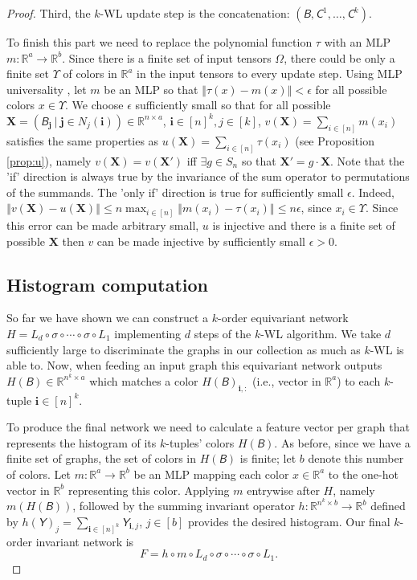 \documentclass{article}
\newcommand{\norm}[1]{\left\Vert#1\right\Vert}
\newcommand{\parr}[1]{\left (#1\right )}
\newcommand{\Real}{\mathbb R}
\newcommand{\too}{\rightarrow}
\newcommand{\ie}{{i.e.}}
\def\vi{{\bm{i}}}
\def\vj{{\bm{j}}}
\def\mX{{\bm{X}}}
\newcommand{\tens}[1]{\bm{\mathsfit{#1}}}
\def\tB{{\tens{B}}}
\def\tC{{\tens{C}}}
\def\tY{{\tens{Y}}}
\begin{document}
\begin{proof}
Third, the $k$-WL update step is the concatenation: $(\tB,\tC^1,\ldots,\tC^k)$. 


To finish this part we need to replace the polynomial function $\tau$ with an MLP $m:\Real^a\too\Real^b$. Since there is a finite set of input tensors $\Omega$, there could be only a finite set $\Upsilon$ of colors in $\Real^{a}$ in the input tensors to every update step. Using MLP universality \citep{cybenko1989approximation,hornik1991approximation} , let $m$ be an MLP so that $\norm{\tau(x)-m(x)}<\epsilon$ for all possible colors $x\in\Upsilon$.  We choose $\epsilon$ sufficiently small so that for all possible $\mX = \parr{\tB_{\vj} \ \vert \ \vj\in N_j(\vi)}\in\Real^{n\times a} $, $\vi\in[n]^k,j\in [k]$, $v(\mX)=\sum_{i\in [n]}m(x_i)$ satisfies the same properties as $u(\mX)=\sum_{i\in[n]}\tau(x_i)$ (see Proposition \ref{prop:u}), namely $v(\mX)=v(\mX')$ iff $\exists g\in S_n$ so that $\mX'=g\cdot \mX$. Note that the 'if' direction is always true by the invariance of the sum operator to permutations of the summands. The 'only if' direction is true for sufficiently small $\epsilon$. Indeed, $\norm{v(\mX)-u(\mX)}\leq n \max_{i\in [n]}{\norm{m(x_i)-\tau(x_i)}} \leq n\epsilon$, since $x_i\in \Upsilon$. Since this error can be made arbitrary small, $u$ is injective and there is a finite set of possible $\mX$ then $v$ can be made injective by sufficiently small $\epsilon>0$. 

\subsection{Histogram computation}
So far we have shown we can construct a $k$-order equivariant network $H= L_d \circ \sigma \circ \cdots \circ \sigma \circ L_1$ implementing $d$ steps of the $k$-WL algorithm. We take $d$ sufficiently large to discriminate the graphs in our collection as much as $k$-WL is able to. Now, when feeding an input graph this equivariant network outputs $H(\tB)\in\Real^{n^k\times a}$ which matches a color $H(\tB)_{\vi,:}$ (\ie, vector in $\Real^a$) to each $k$-tuple $\vi\in [n]^k$. 

To produce the final network we need to calculate a feature vector per graph that represents the histogram of its $k$-tuples' colors $H(\tB)$. As before, since we have a finite set of graphs, the set of colors in $H(\tB)$ is finite; let $b$ denote this number of colors. Let $m:\Real^a\too \Real^b$ be an MLP mapping each color $x\in\Real^a$ to the one-hot vector in $\Real^b$ representing this color. Applying $m$ entrywise after $H$, namely $m(H(\tB))$, followed by the summing invariant operator $h:\Real^{n^k\times b}\too \Real^b$ defined by $h(\tY)_j= \sum_{\vi\in [n]^k} \tY_{\vi,j}$, $j\in [b]$ provides the desired histogram. Our final $k$-order invariant network is 
$$F=h \circ m \circ L_d \circ \sigma \circ \cdots \circ \sigma \circ L_1.$$


\end{proof}
\end{document}
